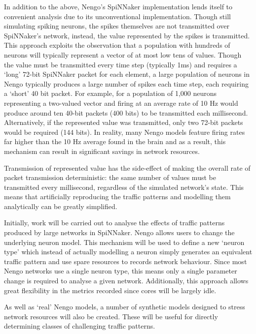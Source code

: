 		In addition to the above, Nengo's SpiNNaker implementation lends itself to
		convenient analysis due to its unconventional implementation. Though still
		simulating spiking neurons, the spikes themselves are not transmitted over
		SpiNNaker's network, instead, the value represented by the spikes is
		transmitted. This approach exploits the observation that a population with
		hundreds of neurons will typically represent a vector of at most low tens of
		values. Though the value must be transmitted every time step (typically 1ms)
		and requires a `long' 72-bit SpiNNaker packet for each element, a large
		population of neurons in Nengo typically produces a large number of spikes
		each time step, each requiring a `short' 40 bit packet. For example, for a
		population of 1,000 neurons representing a two-valued vector and firing at
		an average rate of 10 Hz would produce around ten 40-bit packets (400 bits)
		to be transmitted each millisecond.  Alternatively, if the represented value
		was transmitted, only two 72-bit packets would be required (144 bits). In
		reality, many Nengo models feature firing rates far higher than the 10 Hz
		average found in the brain and as a result, this mechanism can result in
		significant savings in network resources.
		
		Transmission of represented value has the side-effect of making the overall
		rate of packet transmission deterministic: the same number of values must be
		transmitted every millisecond, regardless of the simulated network's state.
		This means that artificially reproducing the traffic patterns and modelling
		them analytically can be greatly simplified.
		
		Initially, work will be carried out to analyse the effects of traffic
		patterns produced by large networks in SpiNNaker. Nengo allows users to
		change the underlying neuron model. This mechanism will be used to define a
		new `neuron type' which instead of actually modelling a neuron simply
		generates an equivalent traffic pattern and use spare resources to records
		network behaviour. Since most Nengo networks use a single neuron type, this
		means only a single parameter change is required to analyse a given network.
		Additionally, this approach allows great flexibility in the metrics recorded
		since cores will be largely idle.
		
		As well as `real' Nengo models, a number of synthetic models designed to
		stress network resources will also be created. These will be useful for
		directly determining classes of challenging traffic patterns.
		
